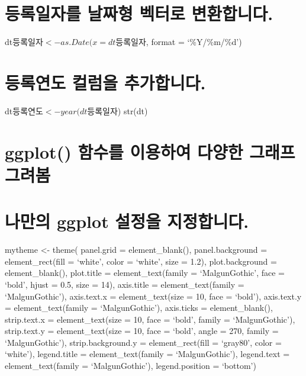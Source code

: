 \documentclass[]{article}
\newenvironment{Shaded}{\begin{snugshade}}{\end{snugshade}}
\newcommand{\KeywordTok}[1]{\textcolor[rgb]{0.13,0.29,0.53}{\textbf{#1}}}
\newcommand{\DataTypeTok}[1]{\textcolor[rgb]{0.13,0.29,0.53}{#1}}
\newcommand{\StringTok}[1]{\textcolor[rgb]{0.31,0.60,0.02}{#1}}
\newcommand{\OperatorTok}[1]{\textcolor[rgb]{0.81,0.36,0.00}{\textbf{#1}}}
\newcommand{\NormalTok}[1]{#1}
\begin{document}
\begin{Shaded}
\end{Shaded}

\section{등록일자를 날짜형 벡터로 변환합니다.}\label{---.}

dt\(등록일자 <- as.Date(x = dt\)등록일자, format = `\%Y/\%m/\%d')

\section{등록연도 컬럼을 추가합니다.}\label{--.}

dt\(등록연도 <- year(dt\)등록일자) str(dt)

\section{ggplot() 함수를 이용하여 다양한 그래프
그려봄}\label{ggplot-----}

\section{나만의 ggplot 설정을 지정합니다.}\label{-ggplot--.}

mytheme \textless{}- theme( panel.grid = element\_blank(),
panel.background = element\_rect(fill = `white', color = `white', size =
1.2), plot.background = element\_blank(), plot.title =
element\_text(family = `MalgunGothic', face = `bold', hjust = 0.5, size
= 14), axis.title = element\_text(family = `MalgunGothic'), axis.text.x
= element\_text(size = 10, face = `bold'), axis.text.y =
element\_text(family = `MalgunGothic'), axis.ticks = element\_blank(),
strip.text.x = element\_text(size = 10, face = `bold', family =
`MalgunGothic'), strip.text.y = element\_text(size = 10, face = `bold',
angle = 270, family = `MalgunGothic'), strip.background.y =
element\_rect(fill = `gray80', color = `white'), legend.title =
element\_text(family = `MalgunGothic'), legend.text =
element\_text(family = `MalgunGothic'), legend.position = `bottom')
\end{document}
